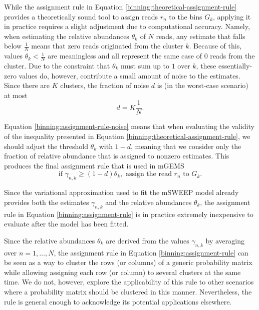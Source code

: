 \documentclass[officiallayout]{tktla}
\begin{document}
While the assignment rule in Equation
\ref{binning:theoretical-assignment-rule} provides a theoretically
sound tool to assign reads $r_{n}$ to the bins $G_{k}$, applying it in
practice requires a slight adjustment due to computational
accuracy. Namely, when estimating the relative abundances $\theta_{k}$
of $N$ reads, any estimate that falls below $\frac{1}{N}$ means that
zero reads originated from the cluster $k$. Because of this, values
$\theta_{k} < \frac{1}{N}$ are meaningless and all represent the same
case of 0 reads from the cluster. Due to the constraint that
$\theta_{k}$ must sum up to $1$ over $k$, these essentially-zero
values do, however, contribute a small amount of noise to the
estimates. Since there are $K$ clusters, the fraction of noise $d$ is
(in the worst-case scenario) at most
\begin{equation}
  \label{binning:assignment-rule-noise}
  d = K\frac{1}{N}.
\end{equation}

Equation \ref{binning:assignment-rule-noise} means that when
evaluating the validity of the inequality presented in Equation
\ref{binning:theoretical-assignment-rule}, we should adjust the
threshold $\theta_k$ with $1 - d$, meaning that we consider only the
fraction of relative abundance that is assigned to nonzero
estimates. This produces the final assignment rule that is used in
mGEMS
\begin{equation}
  \label{binning:assignment-rule}
  \text{if } \gamma_{n, k} \geq (1 - d)\theta_{k}, \text{ assign the read } r_{n} \text{ to } G_{k}.
\end{equation}

Since the variational approximation used to fit the mSWEEP model
already provides both the estimates $\gamma_{n, k}$ and the relative
abundances $\theta_{k}$, the assignment rule in Equation
\ref{binning:assignment-rule} is in practice extremely inexpensive to
evaluate after the model has been fitted.

Since the relative abundances $\theta_k$ are derived from the values
$\gamma_{n, k}$ by averaging over $n = 1, \dots, N$, the assignment
rule in Equation \ref{binning:assignment-rule} can be seen as a way to
cluster the rows (or columns) of a generic probability matrix while
allowing assigning each row (or column) to several clusters at the
same time. We do not, however, explore the applicability of this rule
to other scenarios where a probability matrix should be clustered in
this manner. Nevertheless, the rule is general enough to acknowledge
its potential applications elsewhere.
\end{document}
